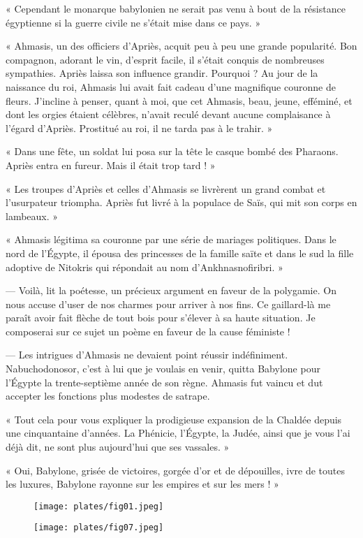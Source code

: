 \documentclass[a4paper, 11pt, oneside, polutonikogreek, french]{article}
\begin{document}
« Cependant le monarque babylonien ne serait pas venu à bout de la résistance égyptienne si la guerre civile ne s'était mise dans ce pays. »

« Ahmasis, un des officiers d'Apriès, acquit peu à peu une grande popularité. Bon compagnon, adorant le vin, d'esprit facile, il s'était conquis de nombreuses sympathies. Apriès laissa son influence grandir. Pourquoi ? Au jour de la naissance du roi, Ahmasis lui avait fait cadeau d'une magnifique couronne de fleurs. J'incline à penser, quant à moi, que cet Ahmasis, beau, jeune, efféminé, et dont les orgies étaient célèbres, n'avait reculé devant aucune complaisance à l'égard d'Apriès. Prostitué au roi, il ne tarda pas à le trahir. »

« Dans une fête, un soldat lui posa sur la tête le casque bombé des Pharaons. Apriès entra en fureur. Mais il était trop tard ! »

« Les troupes d'Apriès et celles d'Ahmasis se livrèrent un grand combat et l'usurpateur triompha. Apriès fut livré à la populace de Saïs, qui mit son corps en lambeaux. »

« Ahmasis légitima sa couronne par une série de mariages politiques. Dans le nord de l'Égypte, il épousa des princesses de la famille saïte et dans le sud la fille adoptive de Nitokris qui répondait au nom d'Ankhnasnofiribri. »

--- Voilà, lit la poétesse, un précieux argument en faveur de la polygamie. On nous accuse d'user de nos charmes pour arriver à nos fins. Ce gaillard-là me paraît avoir fait flèche de tout bois pour s'élever à sa haute situation. Je composerai sur ce sujet un poème en faveur de la cause féministe !

--- Les intrigues d'Ahmasis ne devaient point réussir indéfiniment. Nabuchodonosor, c'est à lui que je voulais en venir, quitta Babylone pour l'Égypte la trente-septième année de son règne. Ahmasis fut vaincu et dut accepter les fonctions plus modestes de satrape.

« Tout cela pour vous expliquer la prodigieuse expansion de la Chaldée depuis une cinquantaine d'années. La Phénicie, l'Égypte, la Judée, ainsi que je vous l'ai déjà dit, ne sont plus aujourd'hui que ses vassales. »

« Oui, Babylone, grisée de victoires, gorgée d'or et de dépouilles, ivre de toutes les luxures, Babylone rayonne sur les empires et sur les mers ! »

\begin{figure}[H]
\centering
\texttt{[image: plates/fig01.jpeg]}
\end{figure}
\clearpage
\begin{figure}[H]
\centering
\texttt{[image: plates/fig07.jpeg]}
\end{figure}
\end{document}
